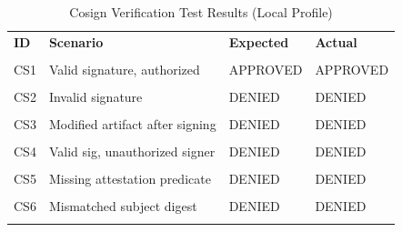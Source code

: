 \begin{table}[htbp]
\caption{Cosign Verification Test Results (Local Profile)}
\label{tab:cosign-verification}
\centering\small
\begin{tabular}{llll}
\toprule
\textbf{ID} & \textbf{Scenario} & \textbf{Expected} & \textbf{Actual} \\\\
\midrule
CS1 & Valid signature, authorized & APPROVED & APPROVED \\\\
CS2 & Invalid signature & DENIED & DENIED \\\\
CS3 & Modified artifact after signing & DENIED & DENIED \\\\
CS4 & Valid sig, unauthorized signer & DENIED & DENIED \\\\
CS5 & Missing attestation predicate & DENIED & DENIED \\\\
CS6 & Mismatched subject digest & DENIED & DENIED \\\\
\bottomrule
\end{tabular}
\end{table}